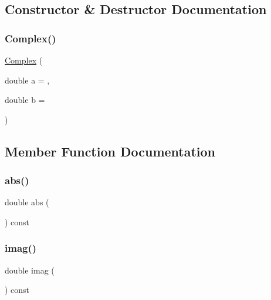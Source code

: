 \subsection{Constructor \& Destructor Documentation}
\mbox{\label{classComplex_a900a80f2ea5c0c3dc9393402b6ce8df3}} 
\subsubsection{\texorpdfstring{Complex()}{Complex()}}
{\footnotesize\ttfamily \mbox{\hyperlink{classComplex}{Complex}} (\begin{DoxyParamCaption}\item[{double}]{a = {},  }\item[{double}]{b = {} }\end{DoxyParamCaption})}



\subsection{Member Function Documentation}
\mbox{\label{classComplex_ad534b137e1216937005dd363a5579ed0}} 
\subsubsection{\texorpdfstring{abs()}{abs()}}
{\footnotesize\ttfamily double abs (\begin{DoxyParamCaption}{ }\end{DoxyParamCaption}) const}

\mbox{\label{classComplex_ac6d0f1ec6a24b5904bc3a206b3c117ff}} 
\subsubsection{\texorpdfstring{imag()}{imag()}}
{\footnotesize\ttfamily double imag (\begin{DoxyParamCaption}{ }\end{DoxyParamCaption}) const}

\mbox{\label{classComplex_a3a3f678878dde3a729f94dfefbdc4ef2}} 
